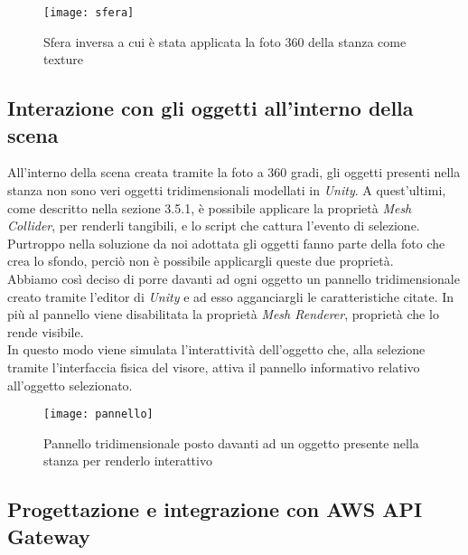 \label{Sfera}
\begin{figure}[ht]
	\begin{center}
		\texttt{[image: sfera]}
		\caption{Sfera inversa a cui è stata applicata la foto 360 della stanza come texture}
	\end{center}
\end{figure}
\FloatBarrier  

\subsection{Interazione con gli oggetti all'interno della scena} 

All'interno della scena creata tramite la foto a 360 gradi, gli oggetti presenti nella stanza non sono veri oggetti tridimensionali modellati in \textit{Unity}. A quest'ultimi, come descritto nella sezione 3.5.1, è possibile applicare la proprietà \textit{Mesh Collider}, per renderli tangibili, e lo script che cattura l'evento di selezione. Purtroppo nella soluzione da noi adottata gli oggetti fanno parte della foto che crea lo sfondo, perciò non è possibile applicargli queste due proprietà. \\
Abbiamo così deciso di porre davanti ad ogni oggetto un pannello tridimensionale creato tramite l'editor di \textit{Unity} e ad esso agganciargli le caratteristiche citate. In più al pannello viene disabilitata la proprietà \textit{Mesh Renderer}, proprietà che lo rende visibile. \\ 
In questo modo viene simulata l'interattività dell'oggetto che, alla selezione tramite l'interfaccia fisica del visore, attiva il pannello informativo relativo all'oggetto selezionato.

\label{Oggetto Interattivo}
\begin{figure}[ht]
	\begin{center}
		\texttt{[image: pannello]}
		\caption{Pannello tridimensionale posto davanti ad un oggetto presente nella stanza per renderlo interattivo}
	\end{center}
\end{figure}
\FloatBarrier  

\subsection{Progettazione e integrazione con AWS API Gateway}

